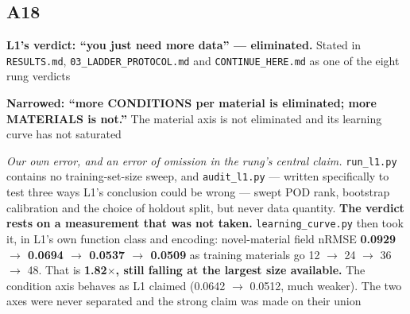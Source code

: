 \documentclass[10pt]{article}
\begin{document}
\subsection*{A18}\label{led:A18}
\begin{description}[leftmargin=0pt,itemsep=1pt]
\item[Claim withdrawn.] \textbf{L1's verdict: ``you just need more data'' --- eliminated.} Stated in \texttt{RESULTS.md}, \texttt{03\_LADDER\_PROTOCOL.md} and \texttt{CONTINUE\_HERE.md} as one of the eight rung verdicts
\item[Replaced with.] \textbf{Narrowed: ``more CONDITIONS per material is eliminated; more MATERIALS is not.''} The material axis is not eliminated and its learning curve has not saturated
\item[Why it was wrong.] \emph{Our own error, and an error of omission in the rung's central claim.} \texttt{run\_l1.py} contains no training-set-size sweep, and \texttt{audit\_l1.py} --- written specifically to test three ways L1's conclusion could be wrong --- swept POD rank, bootstrap calibration and the choice of holdout split, but never data quantity. \textbf{The verdict rests on a measurement that was not taken.} \texttt{learning\_curve.py} then took it, in L1's own function class and encoding: novel-material field nRMSE \textbf{0.0929 $\rightarrow$ 0.0694 $\rightarrow$ 0.0537 $\rightarrow$ 0.0509} as training materials go 12 $\rightarrow$ 24 $\rightarrow$ 36 $\rightarrow$ 48. That is \textbf{1.82$\times$, still falling at the largest size available.} The condition axis behaves as L1 claimed (0.0642 $\rightarrow$ 0.0512, much weaker). The two axes were never separated and the strong claim was made on their union
\end{description}
\end{document}
